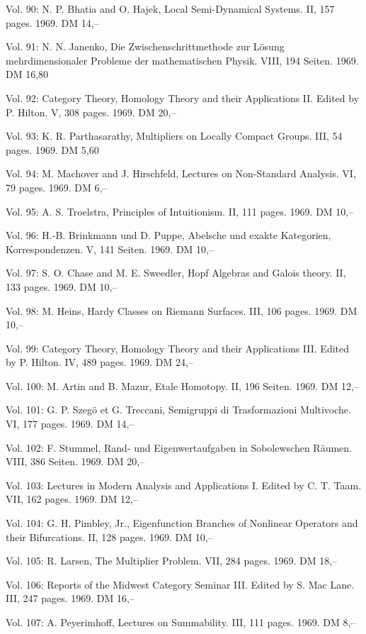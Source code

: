 Vol. 90: N. P. Bhatia and O. Hajek, Local Semi-Dynamical Systems. II, 157 pages. 1969. DM 14,--

Vol. 91: N. N. Janenko, Die Zwischenschrittmethode zur Lösung mehrdimensionaler Probleme der mathematischen Physik. VIII, 194 Seiten. 1969. DM 16,80

Vol. 92: Category Theory, Homology Theory and their Applications II. Edited by P. Hilton. V, 308 pages. 1969. DM 20,--

Vol. 93: K. R. Parthasarathy, Multipliers on Locally Compact Groups. III, 54 pages. 1969. DM 5,60

Vol. 94: M. Machover and J. Hirschfeld, Lectures on Non-Standard Analysis. VI, 79 pages. 1969. DM 6,--

Vol. 95: A. S. Troelstra, Principles of Intuitionism. II, 111 pages. 1969. DM 10,--

Vol. 96: H.-B. Brinkmann und D. Puppe, Abelsche und exakte Kategorien, Korrespondenzen. V, 141 Seiten. 1969. DM 10,--

Vol. 97: S. O. Chase and M. E. Sweedler, Hopf Algebras and Galois theory. II, 133 pages. 1969. DM 10,--

Vol. 98: M. Heins, Hardy Classes on Riemann Surfaces. III, 106 pages. 1969. DM 10,--

Vol. 99: Category Theory, Homology Theory and their Applications III. Edited by P. Hilton. IV, 489 pages. 1969. DM 24,--

Vol. 100: M. Artin and B. Mazur, Etale Homotopy. II, 196 Seiten. 1969. DM 12,--

Vol. 101: G. P. Szegö et G. Treccani, Semigruppi di Trasformazioni Multivoche. VI, 177 pages. 1969. DM 14,--

Vol. 102: F. Stummel, Rand- und Eigenwertaufgaben in Sobolewschen Räumen. VIII, 386 Seiten. 1969. DM 20,--

Vol. 103: Lectures in Modern Analysis and Applications I. Edited by C. T. Taam. VII, 162 pages. 1969. DM 12,--

Vol. 104: G. H. Pimbley, Jr., Eigenfunction Branches of Nonlinear Operators and their Bifurcations. II, 128 pages. 1969. DM 10,--

Vol. 105: R. Larsen, The Multiplier Problem. VII, 284 pages. 1969. DM 18,--

Vol. 106: Reports of the Midwest Category Seminar III. Edited by S. Mac Lane. III, 247 pages. 1969. DM 16,--

Vol. 107: A. Peyerimhoff, Lectures on Summability. III, 111 pages. 1969. DM 8,--


